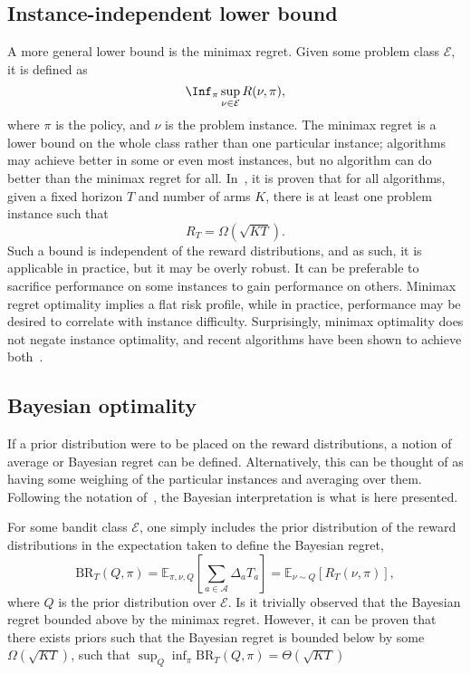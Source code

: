 \subsection{Instance-independent lower bound}
A more general lower bound is the minimax regret.
Given some problem class $\mathcal{E}$, it is defined as
\begin{equation}
    \Inf_{\pi} \sup_{\nu \in \mathcal{E}} R(\nu, \pi),
\end{equation}
where $\pi$ is the policy, and $\nu$ is the problem instance.
The minimax regret is a lower bound on the whole class rather than one particular instance; algorithms may achieve better in some or even most instances, but no algorithm can do better than the minimax regret for all.
In~\autocite{auer2002a}, it is proven that for all algorithms, given a fixed horizon $T$ and number of arms $K$, there is at least one problem instance such that
\begin{equation}
    R_T = \Omega(\sqrt{KT}).
\end{equation}
Such a bound is independent of the reward distributions, and as such, it is applicable in practice, but it may be overly robust.
It can be preferable to sacrifice performance on some instances to gain performance on others.
Minimax regret optimality implies a flat risk profile, while in practice, performance may be desired to correlate with instance difficulty.
Surprisingly, minimax optimality does not negate instance optimality, and recent algorithms have been shown to achieve both~\autocite{menard2017, jin2020}.


\subsection{Bayesian optimality}
\label{sec:bayesian-optimality}
If a prior distribution were to be placed on the reward distributions, a notion of average or Bayesian regret can be defined.
Alternatively, this can be thought of as having some weighing of the particular instances and averaging over them.
Following the notation of~\autocite{lattimore2020}, the Bayesian interpretation is what is here presented.

For some bandit class $\mathcal{E}$, one simply includes the prior distribution of the reward distributions in the expectation taken to define the Bayesian regret,
\begin{equation}
    \text{BR}_T(Q, \pi)
    = \mathbb{E}_{\pi, \nu, Q} \left[ \sum_{a \in \mathcal{A}} \Delta_a T_a \right]
    = \mathbb{E}_{\nu \sim Q} \left[R_T(\nu, \pi) \right],
\end{equation}
where $Q$ is the prior distribution over $\mathcal{E}$.
Is it trivially observed that the Bayesian regret bounded above by the minimax regret.
However, it can be proven that there exists priors such that the Bayesian regret is bounded below by some $\Omega(\sqrt{KT})$, such that $\sup_{Q} \inf_{\pi} \text{BR}_T(Q, \pi) = \Theta(\sqrt{KT})$~\autocite{lattimore2020}

